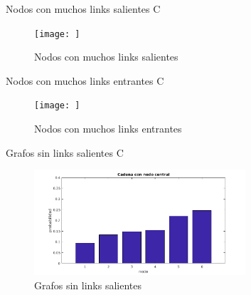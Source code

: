 Nodos con muchos links salientes
C\begin{figure}
	\centering
	\texttt{[image: ]}
	\caption{Nodos con muchos links salientes}
	\label{fig:Ranking nodos con muchos links salientes}
\end{figure}


Nodos con muchos links entrantes
C\begin{figure}
	\centering
	\texttt{[image: ]}
	\caption{Nodos con muchos links entrantes}
	\label{fig:Ranking nodos con muchos links entrantes}
\end{figure}


Grafos sin links salientes
C\begin{figure}
	\centering
	\includegraphics[width=0.7\textwidth]{img/cadena6v1.png}
	\caption{Grafos sin links salientes}
	\label{fig:Ranking grafos sin links salientes}
\end{figure}